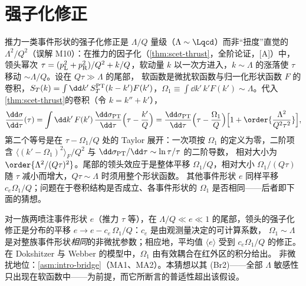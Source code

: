 \section{强子化修正}\label{sec:jets-hadronization}

推力一类事件形状的强子化修正是 $\Lambda/Q$ 量级（$\Lambda\sim\Lqcd$）而非“扭度”直觉的 $\Lambda^2/Q^2$（误解 M10）：在推力的因子化（\cref{thm:scet-thrust}，全阶论证，[A]）中，
领头幂次 $\tau=(p_{\rm L}^2+p_{\rm R}^2)/Q^2+k/Q$，软动量 $k$ 以一次方进入，$k\sim\Lambda$ 的涨落使 $\tau$ 移动 $\sim\Lambda/Q$。设在 $Q\tau\gg\Lambda$ 的尾部，
软函数是微扰软函数与归一化形状函数 $F$ 的卷积，$S_T(k)=\int\dd k'\,S_T^{\rm PT}(k-k')F(k')$，$\Omega_1\equiv\int\dd k'\,k'F(k')\sim\Lambda$。代入\cref{thm:scet-thrust}的卷积（令 $k=k''+k'$），
\begin{equation}\label{eq:jets-shift-derivation}
\frac{\dd\sigma}{\dd\tau}(\tau)=\int\dd k'\,F(k')\,\frac{\dd\sigma_{\rm PT}}{\dd\tau}\Big(\tau-\frac{k'}{Q}\Big)
=\frac{\dd\sigma_{\rm PT}}{\dd\tau}\Big(\tau-\frac{\Omega_1}{Q}\Big)\Big[1+\order{\frac{\Lambda^2}{Q^2\tau^2}}\Big],
\end{equation}
第二个等号是在 $\tau-\Omega_1/Q$ 处的 Taylor 展开：一次项按 $\Omega_1$ 的定义为零，二阶项含 $\langle(k'-\Omega_1)^2\rangle_F/Q^2$ 与 $\dd\sigma_{\rm PT}/\dd\tau\sim\ln\tau/\tau$ 的二阶导数，
相对大小为 $\order{\Lambda^2/(Q\tau)^2}$。尾部的领头效应于是整体平移 $\Omega_1/Q$，相对大小 $\Omega_1/(Q\tau)$ 随 $\tau$ 减小而增大，$Q\tau\sim\Lambda$ 时须用整个形状函数\cite{Korchemsky:1999kt,Bauer:2003di}。
其他事件形状 $e$ 同样平移 $c_e\Omega_1/Q$；问题在于卷积结构是否成立、各事件形状的 $\Omega_1$ 是否相同——后者即下面的猜想。

\begin{conjecture}\label{conj:jets-hadronization}
对一族两喷注事件形状 $e$（推力 $\tau$ 等），在 $\Lambda/Q\ll e\ll1$ 的尾部，领头的强子化修正是分布的平移 $e\to e-c_e\,\Omega_1/Q$：$c_e$ 是由观测量决定的可计算系数，
$\Omega_1\sim\Lambda$ 是对整族事件形状\emph{相同}的非微扰参数；相应地，平均值 $\langle e\rangle$ 受到 $c_e\Omega_1/Q$ 的修正。在 Dokshitzer 与 Webber 的模型中，$\Omega_1$ 由有效耦合在红外区的积分给出\cite{DokshitzerWebber1995}。
非微扰地位：\cref{asm:intro-bridge}（MA1、MA2）。本猜想以其 (Br2)——全部 $\Lambda$ 敏感性只出现在软函数中——为前提，而它所断言的普适性超出该假设。
\end{conjecture}

